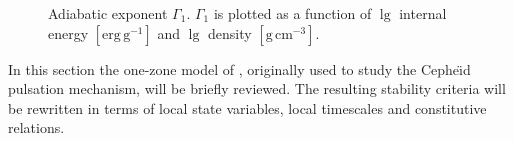\documentclass{aa}
\begin{document}
   \begin{figure*}
   \centering
   \caption{Adiabatic exponent $\Gamma_1$.
               $\Gamma_1$ is plotted as a function of
               $\lg$ internal energy $\mathrm{[erg\,g^{-1}]}$ and $\lg$
               density $\mathrm{[g\,cm^{-3}]}$.}
              \label{FigGam}%
    \end{figure*}
%
   In this section the one-zone model of \citet{baker},
   originally used to study the Cephe{\"{\i}}d pulsation mechanism, will
   be briefly reviewed. The resulting stability criteria will be
   rewritten in terms of local state variables, local timescales and
   constitutive relations.
\end{document}
